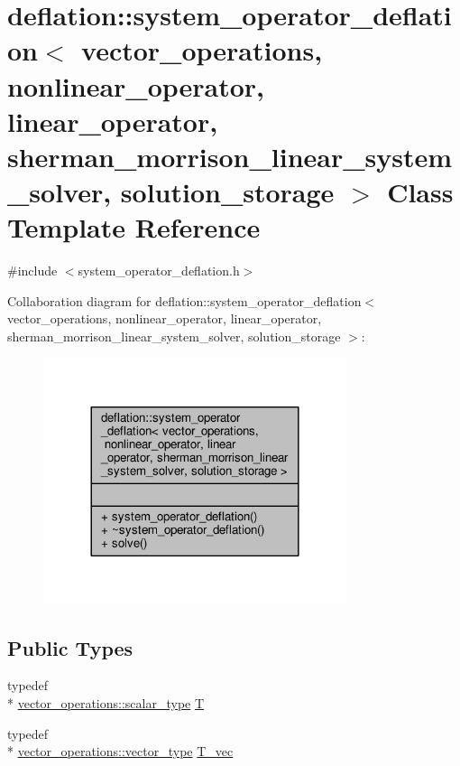 \hypertarget{classdeflation_1_1system__operator__deflation}{\section{deflation\-:\-:system\-\_\-operator\-\_\-deflation$<$ vector\-\_\-operations, nonlinear\-\_\-operator, linear\-\_\-operator, sherman\-\_\-morrison\-\_\-linear\-\_\-system\-\_\-solver, solution\-\_\-storage $>$ Class Template Reference}
\label{classdeflation_1_1system__operator__deflation}
}


{\ttfamily \#include $<$system\-\_\-operator\-\_\-deflation.\-h$>$}



Collaboration diagram for deflation\-:\-:system\-\_\-operator\-\_\-deflation$<$ vector\-\_\-operations, nonlinear\-\_\-operator, linear\-\_\-operator, sherman\-\_\-morrison\-\_\-linear\-\_\-system\-\_\-solver, solution\-\_\-storage $>$\-:\nopagebreak
\begin{figure}[H]
\begin{center}
\leavevmode
\includegraphics[width=252pt]{classdeflation_1_1system__operator__deflation__coll__graph}
\end{center}
\end{figure}
\subsection*{Public Types}
\begin{DoxyCompactItemize}
\item 
typedef \\*
\hyperlink{structcpu__vector__operations_aca6b216aa1fb172df83d98350e94fd61}{vector\-\_\-operations\-::scalar\-\_\-type} \hyperlink{classdeflation_1_1system__operator__deflation_ac9c012537cdfa0be8c8ebda025dd71ba}{T}
\item 
typedef \\*
\hyperlink{structcpu__vector__operations_a1962836df596ce262704d208e9a6d8f9}{vector\-\_\-operations\-::vector\-\_\-type} \hyperlink{classdeflation_1_1system__operator__deflation_a049936d7a4abda90adcccdc8ff56e186}{T\-\_\-vec}
\end{DoxyCompactItemize}
